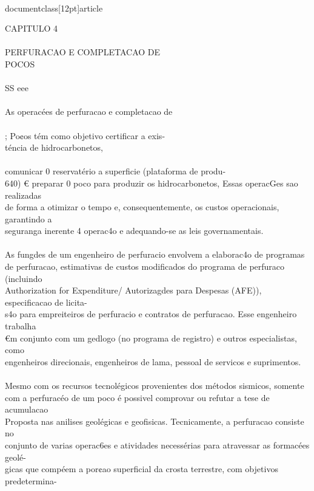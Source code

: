 \\documentclass[12pt]{article}
\begin{document}
{CAPITULO 4\\
\\
PERFURACAO E COMPLETACAO DE\\
POCOS\\
\\
SS eee\\
\\
As operacées de perfuracao e completacao de\\
\\
; Po¢os tém como objetivo certificar a exis-\\
téncia de hidrocarbonetos,\\
\\
comunicar 0 reservatério a superficie (plataforma de produ-\\
640) € preparar 0 poco para produzir os hidrocarbonetos, Essas operacGes sao realizadas\\
de forma a otimizar o tempo e, consequentemente, os custos operacionais, garantindo a\\
seguranga inerente 4 operac4o e adequando-se as leis governamentais.\\
\\
As fungdes de um engenheiro de perfuracio envolvem a elaborac4o de programas\\
de perfuracao, estimativas de custos modificados do programa de perfuraco (incluindo\\
Authorization for Expenditure/ Autorizagdes para Despesas (AFE)), especificacao de licita-\\
s4o para empreiteiros de perfuracio e contratos de perfuracao. Esse engenheiro trabalha\\
€m conjunto com um gedlogo (no programa de registro) e outros especialistas, como\\
engenheiros direcionais, engenheiros de lama, pessoal de servicos e suprimentos.\\
\\
Mesmo com os recursos tecnolégicos provenientes dos métodos sismicos, somente\\
com a perfuracéo de um poco é possivel comprovar ou refutar a tese de acumulacao\\
Proposta nas anilises geolégicas e geofisicas. Tecnicamente, a perfuracao consiste no\\
conjunto de varias operac6es e atividades necessérias para atravessar as formacées geolé-\\
gicas que compéem a por¢ao superficial da crosta terrestre, com objetivos predetermina-\\
}
\end{document}

